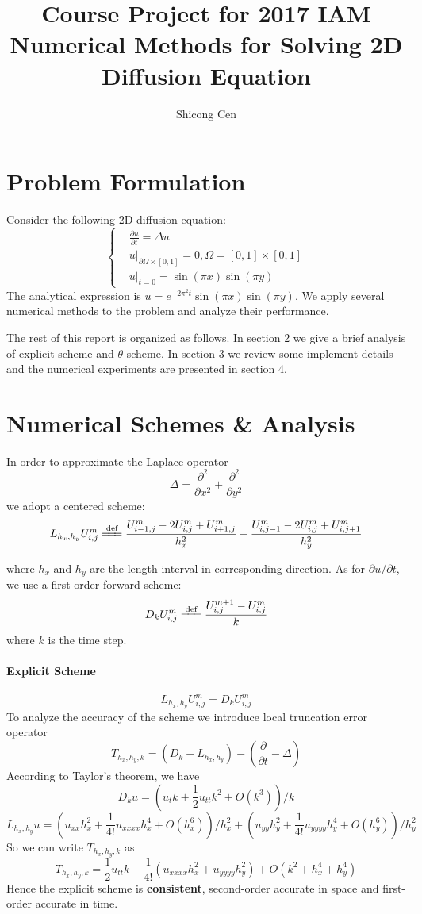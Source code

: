 \documentclass[12pt]{article}
\newcommand{\eqdef}{\xlongequal{\text{def}}}%
\begin{document}
\author{Shicong Cen}
\title{Course Project for 2017 IAM\\Numerical Methods for Solving 2D Diffusion Equation}
\maketitle
\section{Problem Formulation}
Consider the following 2D diffusion equation:
$$
\left\{
\begin{aligned}
&\frac{\partial u}{\partial t} = \Delta u\\
&u|_{\partial \Omega\times[0,1]} = 0, \Omega = [0,1]\times [0,1]\\
&u|_{t=0}=\sin(\pi x)\sin(\pi y)
\end{aligned}
\right.
$$
The analytical expression is $u = e^{-2\pi^2t}\sin(\pi x)\sin(\pi y)$. We apply several numerical methods to the problem and analyze their performance.

The rest of this report is organized as follows. In section 2 we give a brief analysis of explicit scheme and $\theta$ scheme. In section 3 we review some implement details and the numerical experiments are presented in section 4.
\section{Numerical Schemes \& Analysis}
In order to approximate the Laplace operator 
$$\Delta = \frac{\partial^2}{\partial x^2} + \frac{\partial^2}{\partial y^2}$$ we adopt a centered scheme:
$$
L_{h_x,h_y}U_{i,j}^m \eqdef \frac{U_{i-1,j}^m-2U_{i,j}^m+U_{i+1,j}^m}{h_x^2} + \frac{U_{i,j-1}^m-2U_{i,j}^m+U_{i,j+1}^m}{h_y^2}
$$

where $h_x$ and $h_y$ are the length interval in corresponding direction. As for $\partial u/\partial t$, we use a first-order forward scheme:
$$
D_k U_{i,j}^m \eqdef \frac{U_{i,j}^{m+1}-U_{i,j}^m}{k}
$$
where $k$ is the time step.

\paragraph{Explicit Scheme}
$$
L_{h_x,h_y}U_{i,j}^m = D_kU_{i,j}^m
$$
To analyze the accuracy of the scheme we introduce local truncation error operator
$$
T_{h_x,h_y,k} = \left(D_k - L_{h_x,h_y}\right) - \left(\frac{\partial}{\partial t} - \Delta\right)
$$
According to Taylor's theorem, we have
$$
D_ku = \left(u_tk + \frac{1}{2}u_{tt}k^2 + O(k^3)\right)/k
$$
$$
L_{h_x,h_y}u = \left(u_{xx}h_x^2 + \frac{1}{4!}u_{xxxx}h_x^4 + O(h_x^6)\right)/h_x^2+\left(u_{yy}h_y^2 + \frac{1}{4!}u_{yyyy}h_y^4 + O(h_y^6)\right)/h_y^2
$$
So we can write $T_{h_x,h_y,k}$ as
$$
T_{h_x,h_y,k} = \frac{1}{2}u_{tt}k - \frac{1}{4!}\left(u_{xxxx}h_x^2+u_{yyyy}h_y^2\right) + O\left(k^2 + h_x^4+h_y^4\right)
$$
Hence the explicit scheme is \textbf{consistent}, second-order accurate in space and first-order accurate in time.
\end{document}
